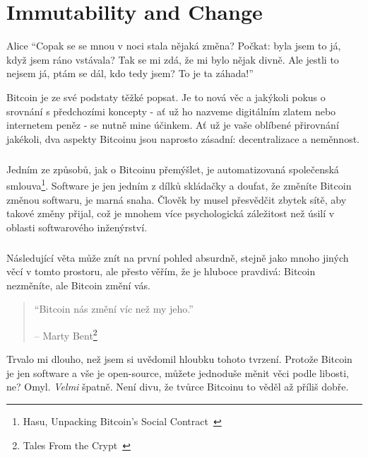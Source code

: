 \chapter{Immutability and Change}
\label{les:1}

\begin{chapquote}{Alice}
\enquote{Copak se se mnou v noci stala nějaká změna? Počkat: byla jsem to já, 
když jsem ráno vstávala? Tak se mi zdá, že mi bylo nějak divně. Ale jestli 
to nejsem já, ptám se dál, kdo tedy jsem? To je ta záhada!}
\end{chapquote}

Bitcoin je ze své podstaty těžké popsat. Je to nová věc a jakýkoli pokus 
o srovnání s předchozími koncepty - ať už ho nazveme digitálním zlatem nebo 
internetem peněz - se nutně mine účinkem. Ať už je vaše oblíbené přirovnání 
jakékoli, dva aspekty Bitcoinu jsou naprosto zásadní: decentralizace a neměnnost.

\paragraph{}
Jedním ze způsobů, jak o Bitcoinu přemýšlet, je automatizovaná společenská smlouva\footnote{Hasu,
Unpacking Bitcoin's Social Contract~\cite{social-contract}}. Software je jen 
jedním z dílků skládačky a doufat, že změníte Bitcoin změnou softwaru, je marná 
snaha. Člověk by musel přesvědčit zbytek sítě, aby takové změny přijal, což je 
mnohem více psychologická záležitost než úsilí v oblasti softwarového inženýrství.

\paragraph{}
Následující věta může znít na první pohled absurdně, stejně jako mnoho jiných věcí 
v tomto prostoru, ale přesto věřím, že je hluboce pravdivá: Bitcoin nezměníte, 
ale Bitcoin změní vás.

\begin{quotation}\begin{samepage}
\enquote{Bitcoin nás změní víc než my jeho.}
\begin{flushright} -- Marty Bent\footnote{Tales From the Crypt~\cite{tftc21}}
\end{flushright}\end{samepage}\end{quotation}

Trvalo mi dlouho, než jsem si uvědomil hloubku tohoto tvrzení. Protože Bitcoin 
je jen software a vše je open-source, můžete jednoduše měnit věci podle libosti, 
ne? Omyl. \textit{Velmi} špatně. Není divu, že tvůrce Bitcoinu to věděl až příliš dobře.

